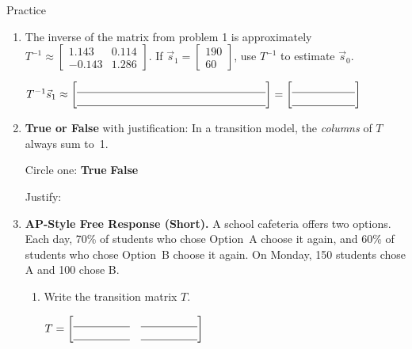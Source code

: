 \documentclass[10pt]{article}
\begin{document}
\begin{notesbox}{Practice}
\begin{enumerate}[leftmargin=1.5em, itemsep=10pt]

    Steady state: Developers $\approx$ \blank{3cm} \quad Managers $\approx$ \blank{3cm}

    \vspace{8pt}
    \item The inverse of the matrix from problem 1 is approximately
    $T^{-1} \approx \begin{bmatrix}1.143 & 0.114 \\ -0.143 & 1.286\end{bmatrix}$.
    If $\vec{s}_1 = \begin{bmatrix}190\\60\end{bmatrix}$, use $T^{-1}$ to estimate $\vec{s}_0$.

    \vspace{6pt}
    $T^{-1}\vec{s}_1 \approx \begin{bmatrix}\blank{6cm}\\\blank{6cm}\end{bmatrix} = \begin{bmatrix}\blank{2cm}\\\blank{2cm}\end{bmatrix}$

    \vspace{8pt}
    \item \textbf{True or False} with justification: In a transition model,
    the \emph{columns} of $T$ always sum to~1.

    \vspace{4pt}
    Circle one: \quad \textbf{True} \quad \textbf{False}

    \vspace{4pt}
    Justify: \writeline

    \vspace{8pt}
    \item \textbf{AP-Style Free Response (Short).}
    A school cafeteria offers two options. Each day, 70\% of students who chose
    Option~A choose it again, and 60\% of students who chose Option~B choose it again.
    On Monday, 150 students chose A and 100 chose B.

    \begin{enumerate}[label=(\alph*), leftmargin=1.5em, itemsep=6pt]
        \item Write the transition matrix $T$.

        \vspace{4pt}
        $T = \begin{bmatrix}\blank{1.8cm} & \blank{1.8cm} \\ \blank{1.8cm} & \blank{1.8cm}\end{bmatrix}$


\end{enumerate}
\end{enumerate}
\end{notesbox}
\end{document}
